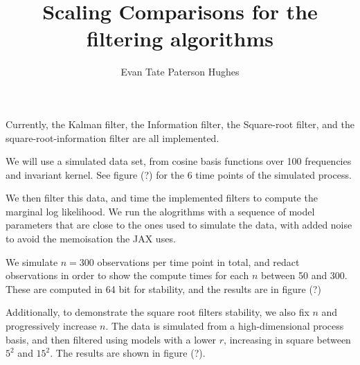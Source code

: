 \documentclass[
]{report}
\title{Scaling Comparisons for the filtering algorithms}
\author{Evan Tate Paterson Hughes}
\date{}
\renewcommand*\contentsname{Table of contents}
\newcommand\contentsname{Table of contents}
\begin{document}
\maketitle

\renewcommand*\contentsname{Table of contents}
{
\hypersetup{linkcolor=}
\setcounter{tocdepth}{2}
\tableofcontents
}

Currently, the Kalman filter, the Information filter, the Square-root
filter, and the square-root-information filter are all implemented.

We will use a simulated data set, from cosine basis functions over 100
frequencies and invariant kernel. See figure (?) for the 6 time points
of the simulated process.

We then filter this data, and time the implemented filters to compute
the marginal log likelihood. We run the alogrithms with a sequence of
model parameters that are close to the ones used to simulate the data,
with added noise to avoid the memoisation the JAX uses.

We simulate \(n=300\) observations per time point in total, and redact
observations in order to show the compute times for each \(n\) between
50 and 300. These are computed in 64 bit for stability, and the results
are in figure (?)

Additionally, to demonstrate the square root filters stability, we also
fix \(n\) and progressively increase \(n\). The data is simulated from a
high-dimensional process basis, and then filtered using models with a
lower \(r\), increasing in square between \(5^2\) and \(15^2\). The
results are shown in figure (?).
\end{document}
